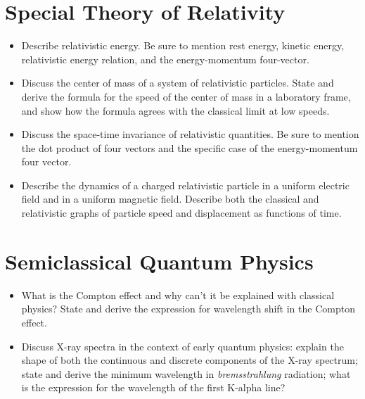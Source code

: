 



\tableofcontents
    
\section{Special Theory of Relativity}
\begin{itemize}

    \item Describe relativistic energy.
    Be sure to mention rest energy, kinetic energy, relativistic energy relation, and the energy-momentum four-vector.

    \item Discuss the center of mass of a system of relativistic particles.
    State and derive the formula for the speed of the center of mass in a laboratory frame, and show how the formula agrees with the classical limit at low speeds.

    \item Discuss the space-time invariance of relativistic quantities.
    Be sure to mention the dot product of four vectors and the specific case of the energy-momentum four vector.

    \item Describe the dynamics of a charged relativistic particle in a uniform electric field and in a uniform magnetic field.
    Describe both the classical and relativistic graphs of particle speed and displacement as functions of time.

\end{itemize}

\section{Semiclassical Quantum Physics}
\begin{itemize}

    \item What is the Compton effect and why can't it be explained with classical physics?
    State and derive the expression for wavelength shift in the Compton effect. 

    \item Discuss X-ray spectra in the context of early quantum physics:
    explain the shape of both the continuous and discrete components of the X-ray spectrum;
    state and derive the minimum wavelength in \textit{bremsstrahlung} radiation;
    what is the expression for the wavelength of the first K-alpha line?

\end{itemize}

